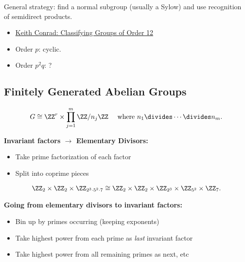 General strategy: find a normal subgroup (usually a Sylow) and use
recognition of semidirect products.

\begin{itemize}
\tightlist
\item
  \href{https://kconrad.math.uconn.edu/blurbs/grouptheory/group12.pdf}{Keith
  Conrad: Classifying Groups of Order 12}
\item
  Order \(p\): cyclic.
\item
  Order \(p^2q\): ?
\end{itemize}

\hypertarget{finitely-generated-abelian-groups}{%
\subsection{Finitely Generated Abelian
Groups}\label{finitely-generated-abelian-groups}}

\begin{definition}

\[
G \cong \ZZ^r \times \prod_{j=1}^m \ZZ/n_j\ZZ
\quad \text{ where } n_1 \divides \cdots \divides n_m
.\]

\end{definition}

\textbf{Invariant factors \(\to\) Elementary Divisors:}

\begin{itemize}
\tightlist
\item
  Take prime factorization of each factor
\item
  Split into coprime pieces
\end{itemize}

\begin{example}

\begin{align*}
\ZZ_2 \times \ZZ_2 \times \ZZ_{2^3 \cdot 5^2 \cdot 7}
\cong
\ZZ_2 \times \ZZ_2 \times \ZZ_{2^3} \times \ZZ_{5^2} \times \ZZ_7
.\end{align*}

\end{example}

\textbf{Going from elementary divisors to invariant factors:}

\begin{itemize}
\tightlist
\item
  Bin up by primes occurring (keeping exponents)
\item
  Take highest power from each prime as \emph{last} invariant factor
\item
  Take highest power from all remaining primes as next, etc
\end{itemize}

